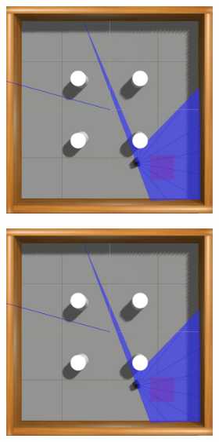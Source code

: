 \begin{figure}[H]
\begin{center}
\begin{subfigure}[b]{0.60\textwidth}
\begin{subfigure}[b]{0.24\textwidth}
        \end{subfigure}
        \hfill
        \begin{subfigure}[b]{0.24\textwidth}
            \includegraphics[width=\textwidth]{imagens/simulated_envs/sim_env2_ddpg/7.png}
        \end{subfigure}
        \hfill
        \begin{subfigure}[b]{0.24\textwidth}
            \includegraphics[width=\textwidth]{imagens/simulated_envs/sim_env2_ddpg/7.png}

\end{subfigure}
\end{subfigure}
\end{center}
\end{figure}
